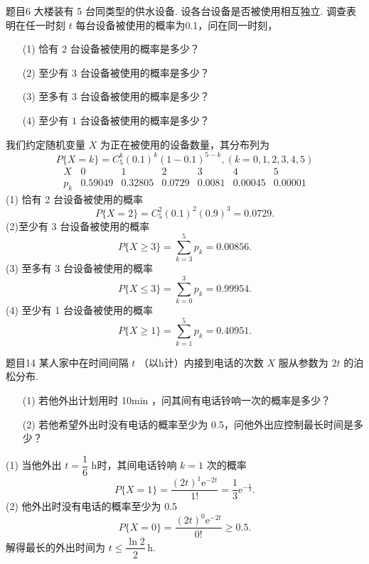 \begin{question}{题目6}
    大楼装有 5 台同类型的供水设备. 设各台设备是否被使用相互独立. 调查表明在任一时刻 $t$ 每台设备被使用的概率为0.1，问在同一时刻，
    \begin{itemize}
        \item [(1)] 恰有 $2$ 台设备被使用的概率是多少？
        \item [(2)] 至少有 $3$ 台设备被使用的概率是多少？
        \item [(3)] 至多有 $3$ 台设备被使用的概率是多少？
        \item [(4)] 至少有 $1$ 台设备被使用的概率是多少？
    \end{itemize}
\end{question}
\begin{solution}
    我们约定随机变量 $X$ 为正在被使用的设备数量，其分布列为
    $$
        P\{X = k\} = C_5^k(0.1)^k(1-0.1)^{5-k},(k = 0, 1, 2, 3, 4, 5)
    $$
    $$
        \begin{array}{c|ccccccc}
            X   & 0       & 1       & 2      & 3      & 4       & 5       \\
            \hline
            p_k & 0.59049 & 0.32805 & 0.0729 & 0.0081 & 0.00045 & 0.00001
        \end{array}
    $$
    (1) 恰有 2 台设备被使用的概率
    $$
        P\{X=2\} = C_5^2(0.1)^2(0.9)^3 = 0.0729.
    $$
    (2)至少有 3 台设备被使用的概率
    $$
        P\{X \geqslant 3\} = \sum_{k=3}^5 p_k = 0.00856.
    $$
    (3) 至多有 3 台设备被使用的概率
    $$
        P\{X \leqslant 3\} = \sum_{k=0}^3 p_k = 0.99954.
    $$
    (4) 至少有 1 台设备被使用的概率
    $$
        P\{X \geqslant 1\} = \sum_{k=1}^5 p_k = 0.40951.
    $$
\end{solution}

\begin{question}{题目14}
    某人家中在时间间隔 $t$ （以h计）内接到电话的次数 $X$ 服从参数为 $2t$ 的泊松分布.
    \begin{itemize}
        \item [(1)] 若他外出计划用时 10min ，问其间有电话铃响一次的概率是多少？
        \item [(2)] 若他希望外出时没有电话的概率至少为 0.5，问他外出应控制最长时间是多少？
    \end{itemize}
\end{question}
\begin{solution}
    (1) 当他外出 $t = \dfrac{1}{6}$ h时，其间电话铃响 $k=1$ 次的概率
    $$
        P\{X=1\} = \frac{(2t)^1\mathrm{e}^{-2t}}{1!}
        = \frac{1}{3}\mathrm{e}^{-\frac{1}{3}}.
    $$
    (2) 他外出时没有电话的概率至少为 0.5
    $$
        P\{X=0\} = \frac{(2t)^0\mathrm{e}^{-2t}}{0!} \geqslant 0.5.
    $$
    解得最长的外出时间为 $t \leqslant \dfrac{\ln2}{2} \,\mathrm{h}$.
\end{solution}


